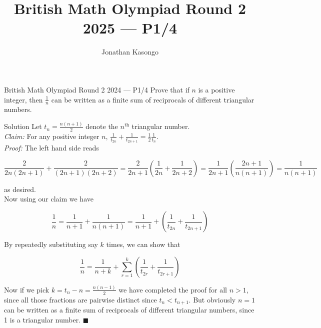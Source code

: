 \documentclass{article}
\author{Jonathan Kasongo}
\title{British Math Olympiad Round 2 2025 --- P1/4}
\begin{document}
\maketitle

\begin{problem}{British Math Olympiad Round 2 2024 --- P1/4}
Prove that if $n$ is a positive integer, then $\frac{1}{n}$ can be written
as a finite sum of reciprocals of different triangular numbers.
\end{problem}

\begin{solution}{Solution}
Let $t_n = \frac{n(n+1)}{2}$ denote the $n^{\text{th}}$ triangular number.
\\

\textit{Claim:} For any positive integer $n$,
$\frac{1}{t_{2n}} + \frac{1}{t_{2n + 1}} = \frac{1}{2}\frac{1}{t_n}$.\\

\textit{Proof:} The left hand side reads

\[
\frac{2}{2n(2n + 1)} + \frac{2}{(2n + 1)(2n + 2)}
= \frac{2}{2n + 1} \left( \frac{1}{2n} + \frac{1}{2n + 2} \right)
= \frac{1}{2n + 1} \left( \frac{2n + 1}{n(n+1)} \right)
= \frac{1}{n(n+1)}
\]

as desired.\\

Now using our claim we have

$$
\frac{1}{n} = \frac{1}{n+1} + \frac{1}{n(n+1)} =
\frac{1}{n+1} + \left( \frac{1}{t_{2n}} + \frac{1}{t_{2n + 1}} \right)
$$

By repeatedly substituting say $k$ times, we can show that

$$
\frac{1}{n} = \frac{1}{n+k} + \sum_{r=1}^k \left( \frac{1}{t_{2r}} +
 \frac{1}{t_{2r + 1}} \right)
$$

Now if we pick $k = t_n - n = \frac{n(n-1)}{2}$ we have completed the proof
for all $n > 1$, since all those fractions are pairwise distinct since
$t_n < t_{n+1}$. But obviously $n=1$ can be written
as a finite sum of reciprocals of different triangular numbers, since 1
is a triangular number. $\blacksquare$
\end{solution}
\end{document}
